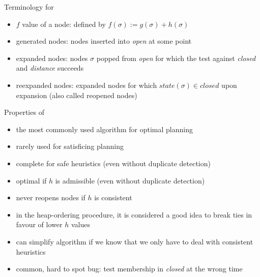 \documentclass{gkibeamer}
\begin{document}
\begin{frame}{Terminology for \astar}
  \begin{itemize}
  \item \alert{$f$ value} of a node: defined by $f(\sigma) :=
    g(\sigma) + h(\sigma)$
  \item \alert{generated nodes:} nodes inserted into \textit{open}
    at some point
  \item \alert{expanded nodes:} nodes $\sigma$ popped from
    \textit{open} for which the test against \textit{closed} and
    \textit{distance} succeeds
  \item \alert{reexpanded nodes:} expanded nodes for which
    $\textit{state}(\sigma) \in \textit{closed}$ upon expansion
    (also called \alert{reopened} nodes)
  \end{itemize}
\end{frame}

\begin{frame}{Properties of \astar}
  \begin{itemize}
  \item the most commonly used algorithm for optimal planning
  \item rarely used for satisficing planning
  \item \alert{complete} for safe heuristics (even without duplicate
    detection)
  \item \alert{optimal} if $h$ is admissible (even without duplicate
    detection)
  \item never reopens nodes if $h$ is consistent
  \end{itemize}
  
  \bigskip

  \begin{itemize}
  \item in the heap-ordering procedure, it is considered a good idea
    to break ties in favour of lower $h$ values
  \item can simplify algorithm if we know that we only
    have to deal with consistent heuristics
  \item common, hard to spot bug: test membership in \textit{closed}
    at the wrong time
  \end{itemize}
\end{frame}
\end{document}

